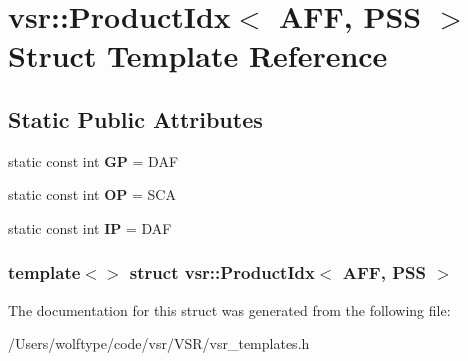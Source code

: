 \hypertarget{structvsr_1_1_product_idx_3_01_a_f_f_00_01_p_s_s_01_4}{\section{vsr\-:\-:Product\-Idx$<$ A\-F\-F, P\-S\-S $>$ Struct Template Reference}
\label{structvsr_1_1_product_idx_3_01_a_f_f_00_01_p_s_s_01_4}
}
\subsection*{Static Public Attributes}
\begin{DoxyCompactItemize}
\item 
\hypertarget{structvsr_1_1_product_idx_3_01_a_f_f_00_01_p_s_s_01_4_a8115ae0ffb81f19949c96cdacc36790f}{static const int {\bfseries G\-P} = D\-A\-F}\label{structvsr_1_1_product_idx_3_01_a_f_f_00_01_p_s_s_01_4_a8115ae0ffb81f19949c96cdacc36790f}

\item 
\hypertarget{structvsr_1_1_product_idx_3_01_a_f_f_00_01_p_s_s_01_4_a033f36e0d0c216dd5b8ed4ac6d338f42}{static const int {\bfseries O\-P} = S\-C\-A}\label{structvsr_1_1_product_idx_3_01_a_f_f_00_01_p_s_s_01_4_a033f36e0d0c216dd5b8ed4ac6d338f42}

\item 
\hypertarget{structvsr_1_1_product_idx_3_01_a_f_f_00_01_p_s_s_01_4_ac5b7ec928508e0658b026a1b727c924c}{static const int {\bfseries I\-P} = D\-A\-F}\label{structvsr_1_1_product_idx_3_01_a_f_f_00_01_p_s_s_01_4_ac5b7ec928508e0658b026a1b727c924c}

\end{DoxyCompactItemize}
\subsubsection*{template$<$$>$ struct vsr\-::\-Product\-Idx$<$ A\-F\-F, P\-S\-S $>$}



The documentation for this struct was generated from the following file\-:\begin{DoxyCompactItemize}
\item 
/\-Users/wolftype/code/vsr/\-V\-S\-R/vsr\-\_\-templates.\-h\end{DoxyCompactItemize}

